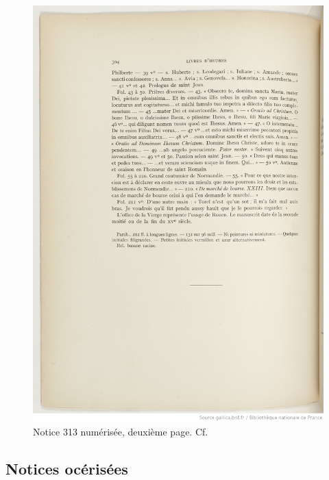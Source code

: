 \documentclass[a4paper,12pt,twoside]{book}
\begin{document}
    \begin{figure}[!h]
    \centering
    \includegraphics[width=15cm]{img/Notices_Leroquais/Notice313/Papier/notice_papier_313_2.jpeg}
    \caption{Notice 313 numérisée, deuxième page. Cf. \cite[p. 305]{Leroquais_notices}}
    \end{figure}
    \clearpage
	
	\subsection{Notices océrisées}
	
	
\end{document}
